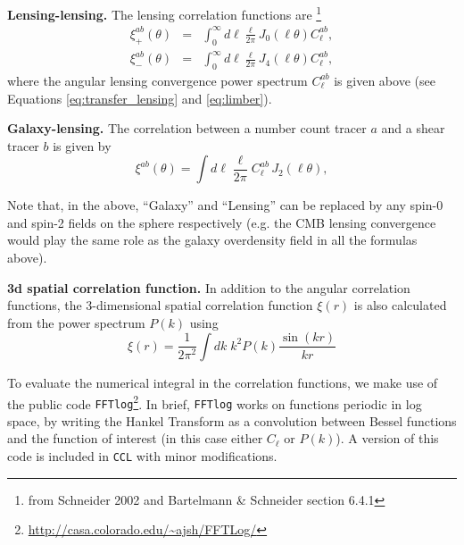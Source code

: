 \documentclass[\docopts]{\docclass}
\newcommand{\ccl}{{\tt CCL}\xspace}
\begin{document}
{\bf Lensing-lensing.} The lensing correlation functions are \footnote{from Schneider 2002 and Bartelmann \& Schneider section 6.4.1}
\begin{eqnarray}
  \xi^{ab}_{+}(\theta)&=&\int_0^{\infty}d\ell\frac{\ell}{2\pi}J_0(\ell\theta)C^{ab}_\ell,\\
  \xi^{ab}_{-}(\theta)&=&\int_0^{\infty}d\ell\frac{\ell}{2\pi}J_4(\ell\theta)C^{ab}_\ell,
\label{eq:xipxim}
\end{eqnarray}
where the angular lensing convergence power spectrum $C^{ab}_\ell$ is given above (see Equations \ref{eq:transfer_lensing} and \ref{eq:limber}).

{\bf Galaxy-lensing.} The correlation between a number count tracer $a$ and a shear tracer $b$ is given by
\begin{equation}
  \xi^{ab}(\theta) = \int d\ell \frac{\ell}{2\pi} C^{ab}_\ell\, J_2(\ell\theta),
\end{equation}

Note that, in the above, ``Galaxy'' and ``Lensing'' can be replaced by any spin-0 and spin-2 fields on the sphere respectively (e.g. the CMB lensing convergence would play the same role as the galaxy overdensity field in all the formulas above).

{\bf 3d spatial correlation function.} In addition to the angular correlation functions, the 3-dimensional spatial correlation function $\xi(r)$ is also
calculated from the power spectrum $P(k)$ using
\begin{equation}
\xi(r) = \frac{1}{2 \pi^2} \int dk \; k^2 P(k) \frac{\sin(kr)}{kr}
\end{equation}


To evaluate the numerical integral in the correlation functions, we make use of the public code {\tt FFTlog}\footnote{\url{http://casa.colorado.edu/~ajsh/FFTLog/}}\citep{Hamilton2000,Talman2009}. In brief, {\tt FFTlog} works on functions periodic in log space, by writing the Hankel Transform as a convolution between Bessel functions and the function of interest (in this case either $C_\ell$ or $P(k)$). A version of this code is included in \ccl with minor modifications.
\end{document}
